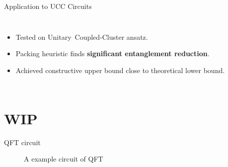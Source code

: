 \documentclass{beamer}
\begin{document}
	
	
	\begin{frame}{Application to UCC Circuits}
		\begin{columns}
			\begin{itemize}
				\item Tested on Unitary Coupled‑Cluster ansatz.
				\item Packing heuristic finds \textbf{significant entanglement reduction}.
				\item Achieved constructive upper bound close to theoretical lower bound.
			\end{itemize}
			
		\end{columns}
	\end{frame}
	
	
	
	\section{WIP}
	\begin{frame}{QFT circuit}
		\begin{figure}
			\caption[]{A example circuit of QFT}
		\end{figure}
	\end{frame}
	
\end{document}
